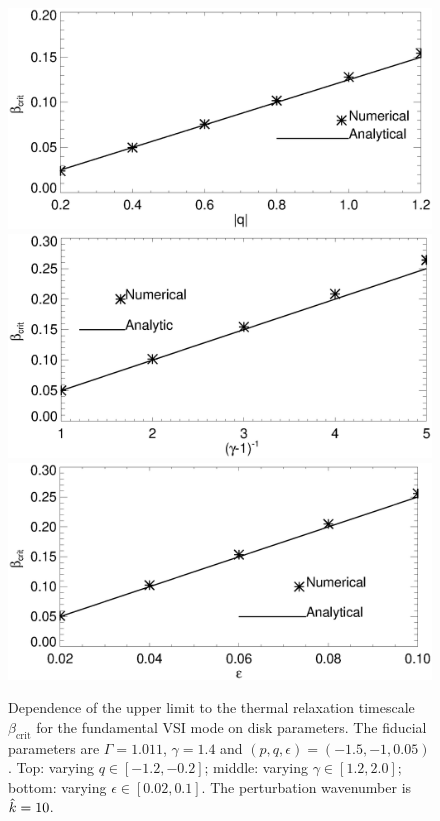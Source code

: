 \begin{figure}
  \includegraphics[width=\linewidth,clip=true,trim=0cm 0.cm 0cm
  0cm]{figures/bcrit_compare_q.ps} 
  \includegraphics[width=\linewidth,clip=true,trim=0cm 0.0cm 0cm
  0.8cm]{figures/bcrit_compare_g.ps}
  \includegraphics[width=\linewidth,clip=true,trim=0cm 0.0cm 0cm
  0.8cm]{figures/bcrit_compare_e.ps} 
  \caption{Dependence of the upper limit to the thermal relaxation timescale
    $\beta_\mathrm{crit}$ for the fundamental VSI mode on disk
    parameters. The fiducial parameters are $\Gamma=1.011$,
    $\gamma=1.4$ and $(p,q,\epsilon)=(-1.5,-1,0.05)$. Top: varying
    $q\in[-1.2,-0.2]$; middle: varying $\gamma\in[1.2,2.0]$; bottom:
    varying $\epsilon\in[0.02,0.1]$. The perturbation wavenumber is
    $\hat{k}=10$.  
    \label{bcrit_compare}}  
\end{figure}

